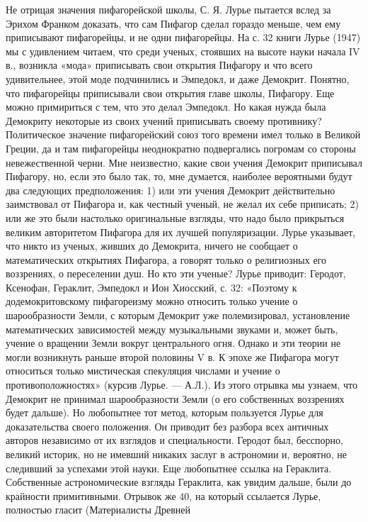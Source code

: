 Не отрицая значения пифагорейской школы, С. Я. Лурье пытается вслед за
Эрихом Франком доказать, что сам Пифагор сделал гораздо меньше, чем
ему приписывают пифагорейцы, и не одни пифагорейцы. На с. 32 книги
Лурье (1947) мы с удивлением читаем, что среди ученых, стоявших на
высоте науки начала IV в., возникла «мода» приписывать свои открытия
Пифагору и что всего удивительнее, этой моде подчинились и Эмпедокл, и
даже Демокрит. Понятно, что пифагорейцы приписывали свои открытия
главе школы, Пифагору. Еще можно примириться с тем, что это делал
Эмпедокл. Но какая нужда была Демокриту некоторые из своих учений
приписывать своему противнику? Политическое значение пифагорейский
союз того времени имел только в Великой Греции, да и там пифагорейцы
неоднократно подвергались погромам со стороны невежественной черни.
Мне неизвестно, какие свои учения Демокрит приписывал Пифагору, но,
если это было так, то, мне думается, наиболее вероятными будут два
следующих предположения: 1) или эти учения Демокрит действительно
заимствовал от Пифагора и, как честный ученый, не желал их себе
приписать; 2) или же это были настолько оригинальные взгляды, что надо
было прикрыться великим авторитетом Пифагора для их лучшей
популяризации. Лурье указывает, что никто из ученых, живших до
Демокрита, ничего не сообщает о математических открытиях Пифагора, а
говорят только о религиозных его воззрениях, о переселении душ. Но кто
эти ученые? Лурье приводит: Геродот, Ксенофан, Гераклит, Эмпедокл и
Ион Хиосский, с. 32: «Поэтому к додемокритовскому пифагореизму можно
относить только учение о шарообразности Земли, с которым Демокрит уже
полемизировал, установление математических зависимостей между
музыкальными звуками и, может быть, учение о вращении Земли вокруг
центрального огня. Однако и эти теории не могли возникнуть раньше
второй половины V в. К эпохе же Пифагора могут относиться только
мистическая спекуляция числами и учение о противоположностях» (курсив
Лурье. --- А.Л.). Из этого отрывка мы узнаем, что Демокрит не принимал
шарообразности Земли (о его собственных воззрениях будет дальше). Но
любопытнее тот метод, которым пользуется Лурье для доказательства
своего положения. Он приводит без разбора всех античных авторов
независимо от их взглядов и специальности. Геродот был, бесспорно,
великий историк, но не имевший никаких заслуг в астрономии и,
вероятно, не следивший за успехами этой науки. Еще любопытнее ссылка
на Гераклита. Собственные астрономические взгляды Гераклита, как
увидим дальше, были до крайности примитивными. Отрывок же 40, на
который ссылается Лурье, полностью гласит (Материалисты Древней

